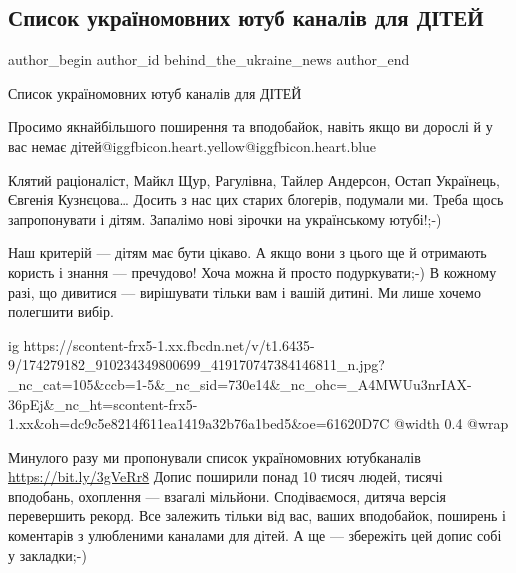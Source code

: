  
 
 
 
 

\subsection{Список україномовних ютуб каналів для ДІТЕЙ}
\label{sec:17_04_2021.fb.behind_the_ukraine_news.1.youtube_kanaly_deti_mova}

\ifcmt
 author_begin
   author_id behind_the_ukraine_news
 author_end
\fi

Список україномовних ютуб каналів для ДІТЕЙ

Просимо якнайбільшого поширення та вподобайок, навіть якщо ви дорослі й у вас
немає дітей@igg{fbicon.heart.yellow}@igg{fbicon.heart.blue}

Клятий раціоналіст, Майкл Щур, Рагулівна, Тайлер Андерсон, Остап Українець,
Євгенія Кузнєцова… Досить з нас цих старих блогерів, подумали ми. Треба щось
запропонувати і дітям. Запалімо нові зірочки на українському ютубі!;-)

Наш критерій — дітям має бути цікаво. А якщо вони з цього ще й отримають
користь і знання — пречудово! Хоча можна й просто подуркувати;-) В кожному
разі, що дивитися — вирішувати тільки вам і вашій дитині. Ми лише хочемо
полегшити вибір.

\ifcmt
  ig https://scontent-frx5-1.xx.fbcdn.net/v/t1.6435-9/174279182_910234349800699_419170747384146811_n.jpg?_nc_cat=105&ccb=1-5&_nc_sid=730e14&_nc_ohc=_A4MWUu3nrIAX-36pEj&_nc_ht=scontent-frx5-1.xx&oh=dc9c5e8214f611ea1419a32b76a1bed5&oe=61620D7C
  @width 0.4
  @wrap 
\fi

Минулого разу ми пропонували список україномовних ютубканалів
\url{https://bit.ly/3gVeRr8} Допис поширили понад 10 тисяч людей, тисячі вподобань,
охоплення — взагалі мільйони. Сподіваємося, дитяча версія перевершить рекорд.
Все залежить тільки від вас, ваших вподобайок, поширень і коментарів з
улюбленими каналами для дітей. А ще — збережіть цей допис собі у закладки;-)

